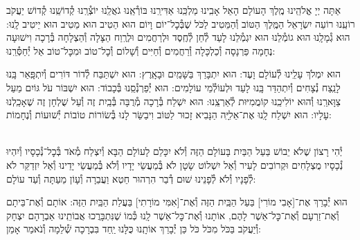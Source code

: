 \documentclass[twoside, openany, parskip=half, 11pt]{book}
\begin{document}
אַתָּה יְיָ אֱלֹהֵֽינוּ מֶֽלֶךְ הָעוֹלָם הָאֵל אָבִֽינוּ מַלְכֵּֽנוּ אַדִּירֵֽנוּ בּוֹרְ֯אֵֽנוּ גֹאֲלֵֽנוּ יוֹצְ֯רֵֽנוּ קְ֯דוֹשֵֽׁנוּ קְ֯דוֹשׁ יַעֲקֹב רוֹעֵֽנוּ רוֹעֵה יִשְׂרָאֵל הַמֶּֽלֶךְ הַטּוֹב וְ֯הַמֵּטִיב לַכֹּל שֶׁבְּ֯כׇל־יוֹם וָיוֹם הוּא הֵטִיב הוּא מֵטִיב הוּא יֵיטִיב לָֽנוּ: הוּא גְ֯מָלָֽנוּ הוּא גוֹמְ֯לֵנוּ הוּא יִגְמְ֯לֵנוּ לָעַד לְ֯חֵן לְ֯חֶֽסֶד וּלְרַחֲמִים וּלְרֶֽוַח הַצָּלָה וְ֯הַצְלָחָה בְּ֯רָכָה וִישׁוּעָה נֶחָמָה פַּרְנָסָה וְ֯כַלְכָּלָה וְ֯רַחֲמִים וְ֯חַיִּים וְ֯שָׁלוֹם וְ֯כׇל־טוֹב וּמִכׇּל־טוֹב אַל יְ֯חַסְּ֯רֵֽנוּ:

הוּא יִמְלֹךְ עָלֵֽינוּ לְ֯עוֹלָם וָעֶד:
הוּא יִתְבָּרַךְ בַּשָּׁמַֽיִם וּבָאָֽרֶץ:
הוּא יִשְׁתַּבַּח לְ֯דוֹר דּוֹרִים וְ֯יִתְפָּֽאַר בָּֽנוּ לָנֵֽצַח נְ֯צָחִים
וְ֯יִתְהַדַּר בָּֽנוּ לָעַד וּלְעוֹלְ֯מֵי עוֹלָמִים:
הוּא יְ֯פַרְנְ֯סֵֽנוּ בְּ֯כָבוֹד:
הוּא יִשְׁבּוֹר עֹל גּוֹיִם מֵעַל צַוָּארֵֽנוּ וְ֯הוּא יוֹלִיכֵֽנוּ קוֹמֲמִיּוּת לְ֯אַרְצֵֽנוּ:
הוּא יִשְׁלַח בְּ֯רָכָה מְ֯רֻבָּה בְּ֯בַֽיִת זֶה וְ֯עַל שֻׁלְחָן זֶה שֶׁאָכַֽלְנוּ עָלָיו:
הוּא יִשְׁלַח לָֽנוּ אֶת־אֵלִיָּֽה הַנָּבִיא זָכוּר לַטּוֹב וִיבַשֵּׂר לָנוּ בְּ֯שׂוֹרוֹת טוֹבוֹת יְ֯שׁוּעוֹת וְ֯נֶחָמוֹת:


\begin{footnotesize}
\\
יְ֯הִי רָצוֹן שֶׁלֹא יֵבוֹשׁ בַּעַל הַבַּיִת בָּעוֹלָם הַזֶּה וְ֯לֹא יִכָּלֵם לָעוֹלָם הַבָּא וְ֯יִצְלַח מְ֯אֹד בְּ֯כׇל־נְ֯כָסָיו וְ֯יִהְיוּ נְ֯כָסָיו מֻצְלָחִים וּקְרוֹבִים לָעִיר וְ֯אַל יִשְׁלוֹט שָׂטָן לֹא בְּ֯מַעֲשֵׂי יָדָיו וְ֯לֹא בְּ֯מַעֲשֵׂי יָדֵינוּ וְ֯אַל יִזְדַקֵּר לֹא לְ֯פָנָיו וְ֯לֹא לְ֯פָנֵינוּ שׁוּם דְ֯בַר הִרְהוּר חֵטְא וַעֲבֵרָה וְ֯עָוֹן מֵעַתָּה וְ֯עַד עוֹלָם:

\end{footnotesize}

הוּא יְ֯בָרֵךְ אֶת־[אָבִי מוֹרִי] בַּעַל הַבַּֽיִת הַזֶּה וְ֯אֶת־[אִמִּי מוֹרָתִי] בַּעֲלַת הַבַּֽיִת הַזֶּה: אוֹתָם וְ֯אֶת־בֵּיתָם וְ֯אֶת־זַרְעָם וְ֯אֶת־כׇּל־אַשֶׁר לָהֶם, אוֹתָנוּ וְ֯אֶת־כׇּל־אַשֶׁר לָֽנוּ כְּ֯מוֹ שֶׁנִּתְבָּרֲכוּ אֲבוֹתֵֽינוּ אַבְרָהָם יִצְחָק וְ֯יַעֲקֹב בַּכֹּל מִכֹּל כֹּל כֵּן יְ֯בָרֵךְ אוֹתָֽנוּ כֻּלָּנוּ יַֽחַד בִּבְרָכָה שְׁ֯לֵמָה וְ֯נֹאמַר אָמֵן:
\end{document}

